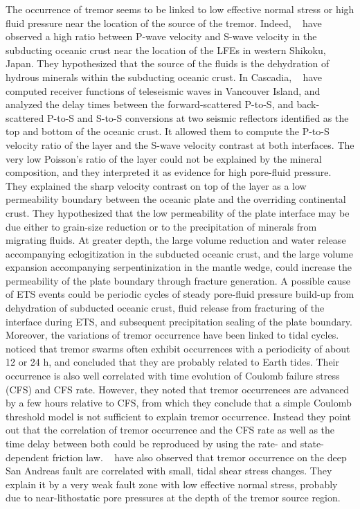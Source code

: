 \documentclass[draft]{agujournal2019}
\begin{document}
The occurrence of tremor seems to be linked to low effective normal stress or high fluid pressure near the location of the source of the tremor. Indeed, ~ have observed a high ratio between P-wave velocity and S-wave velocity in the subducting oceanic crust near the location of the LFEs in western Shikoku, Japan. They hypothesized that the source of the fluids is the dehydration of hydrous minerals within the subducting oceanic crust. In Cascadia, ~ have computed receiver functions of teleseismic waves in Vancouver Island, and analyzed the delay times between the forward-scattered P-to-S, and back-scattered P-to-S and S-to-S conversions at two seismic reflectors identified as the top and bottom of the oceanic crust. It allowed them to compute the P-to-S velocity ratio of the layer and the S-wave velocity contrast at both interfaces. The very low Poisson's ratio of the layer could not be explained by the mineral composition, and they interpreted it as evidence for high pore-fluid pressure. They explained the sharp velocity contrast on top of the layer as a low permeability boundary between the oceanic plate and the overriding continental crust. They hypothesized that the low permeability of the plate interface may be due either to grain-size reduction or to the precipitation of minerals from migrating fluids. At greater depth, the large volume reduction and water release accompanying eclogitization in the subducted oceanic crust, and the large volume expansion accompanying serpentinization in the mantle wedge, could increase the permeability of the plate boundary through fracture generation. A possible cause of ETS events could be periodic cycles of steady pore-fluid pressure build-up from dehydration of subducted oceanic crust, fluid release from fracturing of the interface during ETS, and subsequent precipitation sealing of the plate boundary. \\

Moreover, the variations of tremor occurrence have been linked to tidal cycles. ~ noticed that tremor swarms often exhibit occurrences with a periodicity of about 12 or 24 h, and concluded that they are probably related to Earth tides. Their occurrence is also well correlated with time evolution of Coulomb failure stress (CFS) and CFS rate. However, they noted that tremor occurrences are advanced by a few hours relative to CFS, from which they conclude that a simple Coulomb threshold model is not sufficient to explain tremor occurrence. Instead they point out that the correlation of tremor occurrence and the CFS rate as well as the time delay between both could be reproduced by using the rate- and state-dependent friction law. ~ have also observed that tremor occurrence on the deep San Andreas fault are correlated with small, tidal shear stress changes. They explain it by a very weak fault zone with low effective normal stress, probably due to near-lithostatic pore pressures at the depth of the tremor source region. \\
\end{document}
